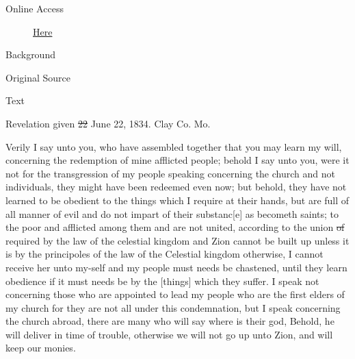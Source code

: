 				\begin{description}
					\item[Online Access] \href{https://www.josephsmithpapers.org/paper-summary/revelation-22-june-1834-dc-105/1}{Here}
				\end{description}
				
				\begin{description}
					\item[Background]
				\end{description}
				
				
				\begin{description}
					\item[Original Source]
				\end{description}
				
				
				\begin{description}
					\item[Text]
				\end{description}
				
					Revelation given \sout{22} June 22, 1834. Clay Co. Mo.
					
					Verily I say unto you, who have assembled together that you may learn my will, concerning the redemption of mine afflicted people; behold I say unto you, were it not for the transgression of my people speaking concerning the church and not individuals, they might have been redeemed even now; but behold, they have not learned to be obedient to the things which I require at their hands, but are full of all manner of evil and do not impart of their substanc[e] as becometh saints; to the poor and afflicted among them and are not united, according to the union \sout{of} required by the law of the celestial kingdom and Zion cannot be built up unless it is by the principoles of the law of the Celestial kingdom otherwise, I cannot receive her unto my-self and my people must needs be chastened, until they learn obedience if it must needs be by the [things] which they suffer. I speak not concerning those who are appointed to lead my people who are the first elders of my church for they are not all under this condemnation, but I speak concerning the church abroad, there are many who will say where is their god, Behold, he will deliver in time of trouble, otherwise we will not go up unto Zion, and will keep our monies.
					

